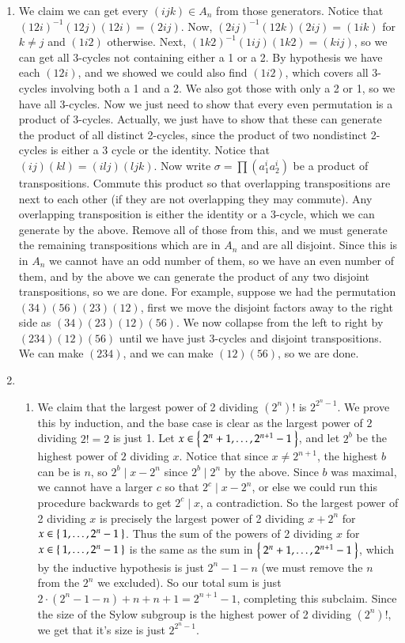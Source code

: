 \documentclass[12pt]{article}
\theoremstyle{definitionstyle}
\begin{document}
\begin{enumerate}[leftmargin=\labelsep]
		\item We claim we can get every $(ijk) \in A_n$ from those generators. Notice that $(12i)^{-1}(12j)(12i) = (2ij)$. Now, $(2ij)^{-1} (12k) (2ij) = (1 i k)$ for $k \neq j$ and $(1i2)$ otherwise. Next, $(1k2)^{-1} (1ij) (1k2) = (kij)$, so we can get all 3-cycles not containing either a 1 or a 2. By hypothesis we have each $(12i)$, and we showed we could also find $(1i2)$, which covers all 3-cycles involving both a 1 and a 2. We also got those with only a 2 or 1, so we have all 3-cycles. Now we just need to show that every even permutation is a product of 3-cycles. Actually, we just have to show that these can generate the product of all distinct 2-cycles, since the product of two nondistinct 2-cycles is either a 3 cycle or the identity. Notice that $(ij)(kl) = (ilj)(ljk)$. Now write $\sigma = \prod (a^i_1 a^i_2)$ be a product of transpositions. Commute this product so that overlapping transpositions are next to each other (if they are not overlapping they may commute). Any overlapping transposition is either the identity or a 3-cycle, which we can generate by the above. Remove all of those from this, and we must generate the remaining transpositions which are in $A_n$ and are all disjoint. Since this is in $A_n$ we cannot have an odd number of them, so we have an even number of them, and by the above we can generate the product of any two disjoint transpositions, so we are done. For example, suppose we had the permutation $(34)(56)(23)(12)$, first we move the disjoint factors away to the right side as $(34)(23)(12)(56)$. We now collapse from the left to right by $(234)(12)(56)$ until we have just 3-cycles and disjoint transpositions. We can make $(234)$, and we can make $(12)(56)$, so we are done.
		
		\item \begin{enumerate}
			\item We claim that the largest power of 2 dividing $(2^n)!$ is $2^{2^n - 1}$. We prove this by induction, and the base case is clear as the largest power of $2$ dividing $2! = 2$ is just 1. Let $x \in \Set{2^n+1, \ldots, 2^{n+1}-1}$, and let $2^b$ be the highest power of $2$ dividing $x$. Notice that since $x \neq 2^{n+1}$, the highest $b$ can be is $n$, so $2^b \mid x - 2^n$ since $2^b \mid 2^n$ by the above. Since $b$ was maximal, we cannot have a larger $c$ so that $2^c \mid x - 2^n$, or else we could run this procedure backwards to get $2^c \mid x$, a contradiction. So the largest power of 2 dividing $x$ is precisely the largest power of 2 dividing $x + 2^n$ for $x \in \Set{1, \ldots, 2^n-1}$. Thus the sum of the powers of 2 dividing $x$ for $x \in \Set{1, \ldots, 2^n-1}$ is the same as the sum in $\Set{2^n+1, \ldots, 2^{n+1}-1}$, which by the inductive hypothesis is just $2^n - 1 - n$ (we must remove the $n$ from the $2^n$ we excluded). So our total sum is just $2\cdot (2^n-1-n) + n + n+1 = 2^{n+1} - 1$, completing this subclaim. Since the size of the Sylow subgroup is the highest power of 2 dividing $(2^n)!$, we get that it's size is just $2^{2^n-1}$.
			

\end{enumerate}
\end{enumerate}
\end{document}
